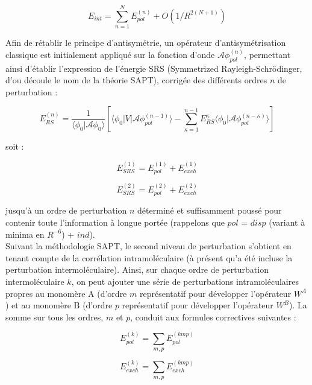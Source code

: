 	\begin{equation}
	E_{int} = \sum_{n=1}^{N} E_{pol}^{(n)} + O(1/R^{2 (N+1)})
	\end{equation}
	
	Afin de rétablir le principe d’antisymétrie, un opérateur d’antisymétrisation classique est initialement appliqué sur la fonction d’onde $\mathscr{A} \phi_{pol}^{(n)}$, permettant ainsi d’établir l’expression de l’énergie SRS (Symmetrized Rayleigh-Schr\"{o}dinger, d’ou découle le nom de la théorie SAPT), corrigée des différents ordres $n$ de perturbation :
	
	\begin{equation}
	E_{RS}^{(n)} = \frac{1}{\langle\phi_{0}|\mathscr{A}\phi_{0}\rangle} \left[\langle\phi_{0} | V| \mathscr{A} \phi_{pol}^{(n-1)}\rangle - \sum_{\kappa=1}^{n-1} E_{RS}^{\kappa} \langle \phi_{0}|\mathscr{A} \phi_{pol}^{(n-\kappa)}\rangle\right]
	\end{equation}
	
	soit :
	
	\begin{equation}
	E_{SRS}^{(1)} = E_{pol}^{(1)} + E_{exch}^{(1)}
	\end{equation}
	
	\begin{equation}
	E_{SRS}^{(2)} = E_{pol}^{(2)} + E_{exch}^{(2)}
	\end{equation}
	
	jusqu’à un ordre de perturbation $n$ déterminé et suffisamment poussé pour contenir toute l’information à longue portée (rappelons que $pol$ = $disp$ (variant à minima en $R^{-6}$) + $ind$).\\
	
	
	Suivant la méthodologie SAPT, le second niveau de perturbation s’obtient en tenant compte de la corrélation intramoléculaire (à présent qu'a été incluse la perturbation intermoléculaire). Ainsi, sur chaque ordre de perturbation intermoléculaire $k$, on peut ajouter une série de perturbations intramoléculaires propres au monomère A (d’ordre $m$ représentatif pour développer l’opérateur $W^{A}$) et au monomère B (d’ordre $p$ représentatif pour développer l’opérateur $W^{B}$). La somme sur tous les ordres, $m$ et $p$, conduit aux formules correctives suivantes :
	
	\begin{equation}
	E_{pol}^{(k)} = \sum_{m,p} E_{pol}^{(kmp)}
	\end{equation}
	
	\begin{equation}
	E_{exch}^{(k)} = \sum_{m,p} E_{exch}^{(kmp)}
	\end{equation}
	

